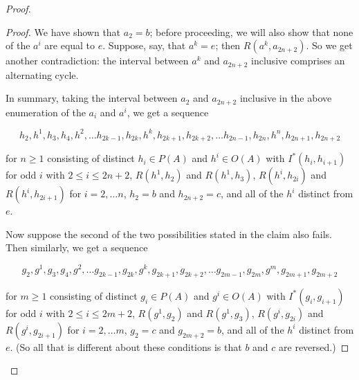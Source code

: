 \documentclass[10pt,a4paper]{amsart}
\begin{document}
\begin{proof}
\begin{proof}
We have shown that $a_2 = b$; before proceeding, we will also show that none of the $a^{i}$ are equal to $e$. Suppose, say, that $a^{k} = e$; then $R(a^{k}, a_{2n+2})$. So we get another contradiction: the interval between $a^k$ and $a_{2n+2}$ inclusive comprises an alternating cycle.

In summary, taking the interval between $a_2$ and $a_{2n+2}$ inclusive in the above enumeration of the $a_i$ and $a^{i}$, we get a sequence


$$h_{2}, h^{1}, h_{3}, h_{4}, h^{2}, \ldots h_{2k-1}, h_{2k},  h^{k}, h_{2k+1}, h_{2k+2}, \ldots h_{2n-1}, h_{2n},  h^{n}, h_{2n+1}, h_{2n+2}$$

for $n \geq 1$ consisting of distinct $h_i \in P(A)$ and $h^i \in O(A)$ with $I^{*}(h_i, h_{i+1})$ for odd $i$ with $2 \leq i \leq  2n+2$, $R(h^{1}, h_2)$ and $R(h^1, h_3)$, $R(h^i, h_{2i})$ and $R(h^i, h_{2i+1})$ for $i = 2, \ldots n $, $h_{2}= b $ and $h_{2n+2} = c$, and all of the $h^{i}$ distinct from $e$.


Now suppose the second of the two possibilities stated in the claim also fails. Then similarly, we get a sequence

$$g_{2}, g^{1}, g_{3}, g_{4}, g^{2}, \ldots g_{2k-1}, g_{2k},  g^{k}, g_{2k+1}, g_{2k+2}, \ldots g_{2m-1}, g_{2m},  g^{m}, g_{2m+1}, g_{2m+2}$$

for $m \geq 1$ consisting of distinct $g_i \in P(A)$ and $g^i \in O(A)$ with $I^{*}(g_i, g_{i+1})$ for odd $i$ with $2 \leq i \leq  2m+2$, $R(g^{1}, g_2)$ and $R(g^1, g_3)$, $R(g^i, g_{2i})$ and $R(g^i, g_{2i+1})$ for $i = 2, \ldots m $, $g_{2}= c $ and $g_{2m+2} = b$, and all of the $h^{i}$ distinct from $e$. (So all that is different about these conditions is that $b$ and $c$ are reversed.)


\end{proof}
\end{proof}
\end{document}

